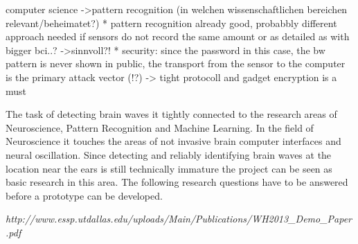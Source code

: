 computer science ->pattern recognition (in welchen wissenschaftlichen bereichen relevant/beheimatet?) 
* pattern recognition already good, probabbly different approach needed if sensors do not record the same amount or as detailed as with bigger bci..? ->sinnvoll?!
* security: since the password in this case, the bw pattern is never shown in public, the transport from the sensor to the computer is the primary attack vector (!?) -> tight protocoll and gadget encryption is a must

The task of detecting brain waves it tightly connected to the research areas of Neuroscience, Pattern Recognition and Machine Learning. In the field of Neuroscience it touches the areas of not invasive brain computer interfaces and neural oscillation. Since detecting and reliably identifying brain waves at the location near the ears is still technically immature the project can be seen as basic research in this area. The following research questions have to be answered before a prototype can be developed.

\em{http://www.essp.utdallas.edu/uploads/Main/Publications/WH2013\_Demo\_Paper.pdf}